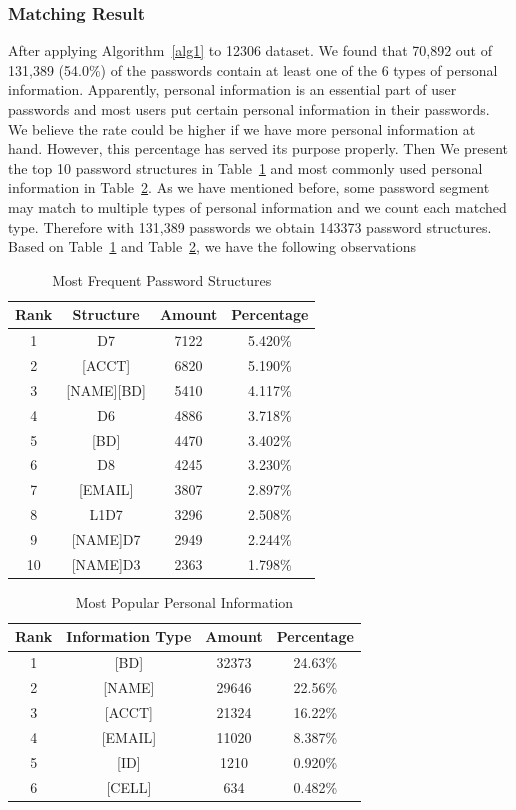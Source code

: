 \documentclass{sig-alternate}
\begin{document}
\subsubsection{Matching Result}
\label{matchingresult}
After applying Algorithm~\ref{alg1} to 12306 dataset. We found that 70,892 out of 131,389 (54.0\%) of the passwords contain at least one of the 6 types of personal information. Apparently, personal information is an essential part of user passwords and most users put certain personal information in their passwords. We believe the rate could be higher if we have more personal information at hand. However, this percentage has served its purpose properly. Then We present the top 10 password structures in Table~\ref{t3} and most commonly used personal information in Table~\ref{t4}. As we have mentioned before, some password segment may match to multiple types of personal information and we count each matched type. Therefore with 131,389 passwords we obtain 143373 password structures. Based on Table~\ref{t3} and Table~\ref{t4}, we have the following observations

\begin{table}
\centering
\caption{Most Frequent Password Structures}
\begin{tabular}{|c|c|c|c|} \hline
Rank&Structure&Amount&Percentage\\ \hline
1&D7&7122&5.420\% \\
2&[ACCT]&6820&5.190\% \\
3&[NAME][BD]&5410&4.117\% \\
4&D6&4886&3.718\% \\
5&[BD]&4470&3.402\% \\
6&D8&4245&3.230\% \\
7&[EMAIL]&3807&2.897\% \\
8&L1D7&3296&2.508\% \\
9&[NAME]D7&2949&2.244\% \\
10&[NAME]D3&2363&1.798\% \\
\hline\end{tabular}
\label{t3}
\end{table}

\begin{table}
\centering
\caption{Most Popular Personal Information}
\begin{tabular}{|c|c|c|c|} \hline
Rank&Information Type&Amount&Percentage\\ \hline
1&[BD]&32373&24.63\%\\
2&[NAME]&29646&22.56\%\\
3&[ACCT]&21324&16.22\%\\
4&[EMAIL]&11020&8.387\%\\
5&[ID]&1210&0.920\%\\
6&[CELL]&634&0.482\%\\
\hline\end{tabular}
\label{t4}
\end{table}
\end{document}
